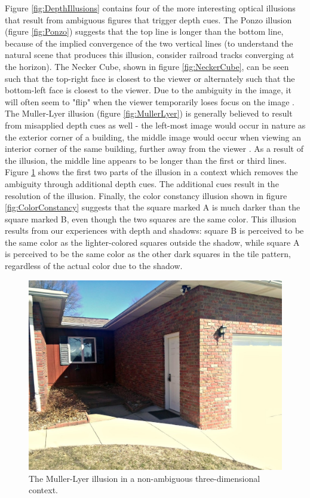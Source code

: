 \documentclass[11pt]{isuthesis}\usepackage[]{graphicx}\usepackage[]{color}
\begin{document}
Figure \ref{fig:DepthIllusions} contains four of the more interesting optical illusions that result from ambiguous figures that trigger depth cues. The Ponzo illusion (figure \ref{fig:Ponzo}) suggests that the top line is longer than the bottom line, because of the implied convergence of the two vertical lines (to understand the natural scene that produces this illusion, consider railroad tracks converging at the horizon). The Necker Cube, shown in figure \ref{fig:NeckerCube}, can be seen such that the top-right face is closest to the viewer or alternately such that the bottom-left face is closest to the viewer. Due to the ambiguity in the image, it will often seem to "flip" when the viewer temporarily loses focus on the image \citep{gregory1997knowledge}. The Muller-Lyer illusion (figure \ref{fig:MullerLyer}) is generally believed to result from misapplied depth cues as well - the left-most image would occur in nature as the exterior corner of a building, the middle image would occur when viewing an interior corner of the same building, further away from the viewer \citep{ward1977case, gregory1968perceptual, fisher1970experimental}. As a result of the illusion, the middle line appears to be longer than the first or third lines. Figure \ref{fig:mullerlyerhouse} shows the first two parts of the illusion in a context which removes the ambiguity through additional depth cues. The additional cues result in the resolution of the illusion. Finally, the color constancy illusion shown in figure \ref{fig:ColorConstancy} suggests that the square marked A is much darker than the square marked B, even though the two squares are the same color. This illusion results from our experiences with depth and shadows: square B is perceived to be the same color as the lighter-colored squares outside the shadow, while square A is perceived to be the same color as the other dark squares in the tile pattern, regardless of the actual color due to the shadow. 

\begin{figure}[htbp]\centering
\includegraphics[width=.5\textwidth]{mullerlyerhouse}
\caption[Muller Lyer Real World Context]{The Muller-Lyer illusion in a non-ambiguous three-dimensional context.}\label{fig:mullerlyerhouse}
\end{figure}
\end{document}

